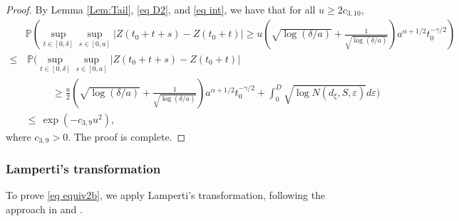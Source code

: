 \documentclass[11pt, reqno]{amsart}
\numberwithin{equation}{section}
\newcommand{\1}{{\bf 1}}
\newcommand{\2}{{\bf 2}}
\begin{document}
\begin{proof}
  By Lemma \ref{Lem:Tail}, \eqref{eq D2}, and  \eqref{eq int},   we have that  for  all $u\ge 2 c_{3,10}$,
      \begin{align*}
     &   {\mathbb P \left(\sup_{t\in [0,  \delta]}\sup_{s\in [0,a]} \left|Z(t_0+t+s)-Z(t_0+t) \right|\ge u\left(\sqrt{\log(\delta/a)}
+\frac{1}{\sqrt{\log(\delta/a)}} \right) a ^{\alpha+1/2}  t_0^{-\gamma/2}\right) }\\ 
  {\le }&\,   { \mathbb P\Bigg(\sup_{t\in [0,  \delta]}\sup_{s\in [0,a]} \left|Z(t_0+t+s)-Z(t_0+t) \right| }\\
 &\,\,\,\, \,\,\,\, \,\,\,\, \,\,\,\,   { \ge \frac{u}{2}\left(\sqrt{\log(\delta/a)}+\frac{1}{\sqrt{\log(\delta/a)}} \right) a ^{\alpha+1/2}  t_0^{-\gamma/2} +\int_0^D\sqrt{\log  N(d_{\xi}, S,\varepsilon)  } d\varepsilon
 \Bigg) }\\
  &  { \le\,  \exp\left(-c_{3,9} u^2\right), }
   \end{align*}   
   where $c_{3,9}>0$.   The proof is complete.
   \end{proof}


\subsubsection{Lamperti's transformation}\label{sec:Lamperti}  {To prove \eqref{eq equiv2b},
we  apply Lamperti's transformation, following the approach in   \cite{TX2007} and \cite{WX2021a}.}
\end{document}
